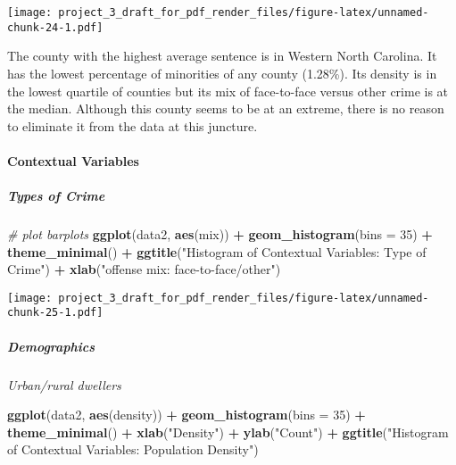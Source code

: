 \documentclass[]{article}
\newenvironment{Shaded}{\begin{snugshade}}{\end{snugshade}}
\newcommand{\CommentTok}[1]{\textcolor[rgb]{0.56,0.35,0.01}{\textit{#1}}}
\newcommand{\DataTypeTok}[1]{\textcolor[rgb]{0.13,0.29,0.53}{#1}}
\newcommand{\DecValTok}[1]{\textcolor[rgb]{0.00,0.00,0.81}{#1}}
\newcommand{\KeywordTok}[1]{\textcolor[rgb]{0.13,0.29,0.53}{\textbf{#1}}}
\newcommand{\NormalTok}[1]{#1}
\newcommand{\OperatorTok}[1]{\textcolor[rgb]{0.81,0.36,0.00}{\textbf{#1}}}
\newcommand{\StringTok}[1]{\textcolor[rgb]{0.31,0.60,0.02}{#1}}
\let\oldparagraph\paragraph
\renewcommand{\paragraph}[1]{\oldparagraph{#1}\mbox{}}
\let\oldsubparagraph\subparagraph
\renewcommand{\subparagraph}[1]{\oldsubparagraph{#1}\mbox{}}
\begin{document}
\texttt{[image: project\_3\_draft\_for\_pdf\_render\_files/figure-latex/unnamed-chunk-24-1.pdf]}

The county with the highest average sentence is in Western North
Carolina. It has the lowest percentage of minorities of any county
(1.28\%). Its density is in the lowest quartile of counties but its mix
of face-to-face versus other crime is at the median. Although this
county seems to be at an extreme, there is no reason to eliminate it
from the data at this juncture.

\hypertarget{contextual-variables-1}{%
\paragraph{Contextual Variables}\label{contextual-variables-1}}

\hypertarget{types-of-crime-1}{%
\subparagraph{Types of Crime}\label{types-of-crime-1}}

\begin{Shaded}
\begin{Highlighting}[]
\CommentTok{# plot barplots}
\KeywordTok{ggplot}\NormalTok{(data2, }\KeywordTok{aes}\NormalTok{(mix)) }\OperatorTok{+}
\StringTok{  }\KeywordTok{geom_histogram}\NormalTok{(}\DataTypeTok{bins =} \DecValTok{35}\NormalTok{) }\OperatorTok{+}
\StringTok{  }\KeywordTok{theme_minimal}\NormalTok{() }\OperatorTok{+}
\StringTok{  }\KeywordTok{ggtitle}\NormalTok{(}\StringTok{"Histogram of Contextual Variables: Type of Crime"}\NormalTok{) }\OperatorTok{+}
\StringTok{  }\KeywordTok{xlab}\NormalTok{(}\StringTok{"offense mix: face-to-face/other"}\NormalTok{)}
\end{Highlighting}
\end{Shaded}

\texttt{[image: project\_3\_draft\_for\_pdf\_render\_files/figure-latex/unnamed-chunk-25-1.pdf]}

\hypertarget{demographics-1}{%
\subparagraph{Demographics}\label{demographics-1}}

\emph{Urban/rural dwellers}

\begin{Shaded}
\begin{Highlighting}[]
\KeywordTok{ggplot}\NormalTok{(data2, }\KeywordTok{aes}\NormalTok{(density)) }\OperatorTok{+}
\StringTok{  }\KeywordTok{geom_histogram}\NormalTok{(}\DataTypeTok{bins =} \DecValTok{35}\NormalTok{) }\OperatorTok{+}
\StringTok{  }\KeywordTok{theme_minimal}\NormalTok{() }\OperatorTok{+}
\StringTok{  }\KeywordTok{xlab}\NormalTok{(}\StringTok{"Density"}\NormalTok{) }\OperatorTok{+}
\StringTok{  }\KeywordTok{ylab}\NormalTok{(}\StringTok{"Count"}\NormalTok{) }\OperatorTok{+}
\StringTok{  }\KeywordTok{ggtitle}\NormalTok{(}\StringTok{"Histogram of Contextual Variables: Population Density"}\NormalTok{)}
\end{Highlighting}
\end{Shaded}
\end{document}
